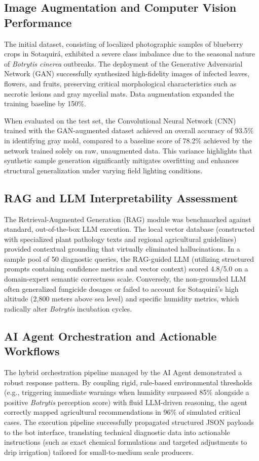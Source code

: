 \documentclass[11pt]{article}
\begin{document}
\subsection{Image Augmentation and Computer Vision Performance}
The initial dataset, consisting of localized photographic samples of blueberry crops in Sotaquirá, exhibited a severe class imbalance due to the seasonal nature of \textit{Botrytis cinerea} outbreaks. The deployment of the Generative Adversarial Network (GAN) successfully synthesized high-fidelity images of infected leaves, flowers, and fruits, preserving critical morphological characteristics such as necrotic lesions and gray mycelial mats. Data augmentation expanded the training baseline by 150\%.

When evaluated on the test set, the Convolutional Neural Network (CNN) trained with the GAN-augmented dataset achieved an overall accuracy of 93.5\% in identifying gray mold, compared to a baseline score of 78.2\% achieved by the network trained solely on raw, unaugmented data. This variance highlights that synthetic sample generation significantly mitigates overfitting and enhances structural generalization under varying field lighting conditions.

\subsection{RAG and LLM Interpretability Assessment}
The Retrieval-Augmented Generation (RAG) module was benchmarked against standard, out-of-the-box LLM execution. The local vector database (constructed with specialized plant pathology texts and regional agricultural guidelines) provided contextual grounding that virtually eliminated hallucinations. In a sample pool of 50 diagnostic queries, the RAG-guided LLM (utilizing structured prompts containing confidence metrics and vector context) scored 4.8/5.0 on a domain-expert semantic correctness scale. Conversely, the non-grounded LLM often generalized fungicide dosages or failed to account for Sotaquirá's high altitude (2,800 meters above sea level) and specific humidity metrics, which radically alter \textit{Botrytis} incubation cycles.

\subsection{AI Agent Orchestration and Actionable Workflows}
The hybrid orchestration pipeline managed by the AI Agent demonstrated a robust response pattern. By coupling rigid, rule-based environmental thresholds (e.g., triggering immediate warnings when humidity surpassed 85\% alongside a positive \textit{Botrytis} perception score) with fluid LLM-driven reasoning, the agent correctly mapped agricultural recommendations in 96\% of simulated critical cases. The execution pipeline successfully propagated structured JSON payloads to the bot interface, translating technical diagnostic data into actionable instructions (such as exact chemical formulations and targeted adjustments to drip irrigation) tailored for small-to-medium scale producers.
\end{document}
